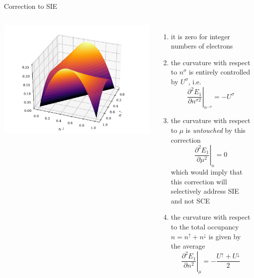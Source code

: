 \documentclass[xcolor=table,aspectratio=169]{beamer}
\numberwithin{equation}{section}
\begin{document}
\begin{frame}{Correction to SIE}
    \begin{columns}
        \centering
        \includegraphics[width=1\columnwidth]{figures/novel_u_correction.pdf}
        \footnotesize
        \begin{enumerate}
            \item it is zero for integer numbers of electrons
            \item the curvature with respect to $n^\sigma$ is entirely controlled by $U^\sigma$, i.e.
                  \begin{equation*}
                      \left.\frac{\partial^2 E_1}{\partial n^{\sigma 2}}\right|_{n^{-\sigma}} = - U^\sigma
                  \end{equation*}
            \item the curvature with respect to $\mu$ is \emph{untouched} by this correction
                  \begin{equation*}
                      \left.\frac{\partial^2 E_1}{\partial \mu^{2}}\right|_{n} = 0
                  \end{equation*}
                  which would imply that this correction will selectively address SIE and not SCE
            \item the curvature with respect to the total occupancy $n = n^\uparrow + n^\downarrow$ is given by the average
                  \begin{equation*}
                      \left.\frac{\partial^2 E_1}{\partial n^{2}}\right|_{\mu} = -\frac{U^\uparrow + U^\downarrow}{2}
                  \end{equation*}
        \end{enumerate}
    \end{columns}
\end{frame}
\end{document}
